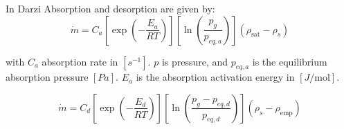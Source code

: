 \documentclass{article}
\begin{document}
In Darzi Absorption and desorption are given by:
\begin{equation}\label{eq:adsorption_full_darzi}
    \dot m = C_a\left[\exp{\left(-\frac{E_a}{RT}\right)}\right]\left[ \ln\left( \frac{p_g}{p_{eq,a}}\right) \right]\left( \rho_{\text{sat}}-\rho_s\right)
\end{equation}

with $C_a$ absorption rate in $[s^{-1}]$. $p$ is pressure, and $p_{eq,a}$ is the equilibrium absorption pressure $[Pa]$. $E_a$ is the absorption activation energy in $[J/\text{mol}]$.

\begin{equation}
    \dot m =C_d
        \left[
            \exp{\left(-\frac{E_d}{RT}\right)}
        \right]
        \left[ 
            \ln\left( \frac{p_g-p_{eq,d}}{p_{eq,d}}\right) 
        \right]
        \left( \rho_{s}-\rho_\text{emp}\right)
\end{equation}
\end{document}
